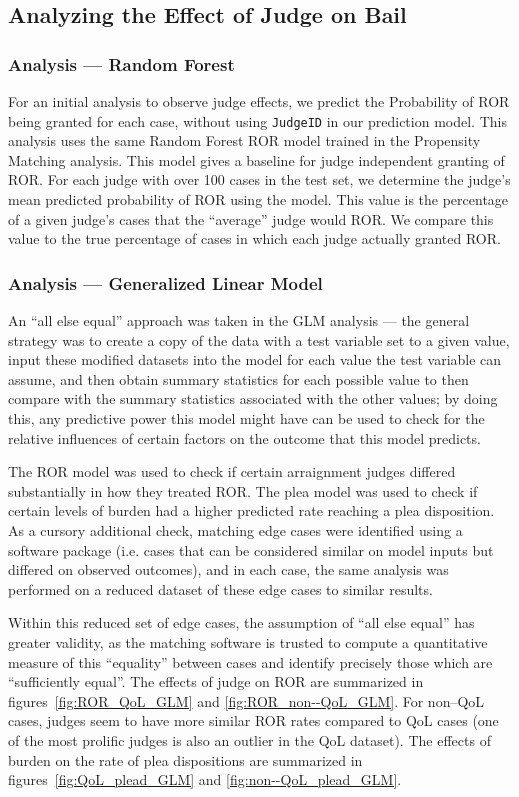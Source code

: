 \subsection{Analyzing the Effect of Judge on Bail}
\subsubsection{Analysis --- Random Forest}
For an initial analysis to observe judge effects,
we predict the Probability of ROR being granted for each case,
without using \texttt{JudgeID} in our prediction model.
This analysis uses the same Random Forest ROR model trained in the Propensity Matching analysis.
This model gives a baseline for judge independent granting of ROR.
For each judge with over 100 cases in the test set,
we determine the judge's mean predicted probability of ROR using the model.
This value is the percentage of a given judge's cases that the ``average'' judge would ROR.
We compare this value to the true percentage of cases in which each judge actually granted ROR.

\subsubsection{Analysis --- Generalized Linear Model}
An ``all else equal'' approach was taken in the GLM analysis
--- the general strategy was to create a copy of the data with a test variable set to a given value,
input these modified datasets into the model for each value the test variable can assume,
and then obtain summary statistics for each possible value
to then compare with the summary statistics associated with the other values;
by doing this,
any predictive power this model might have can be used
to check for the relative influences of certain factors on the outcome that this model predicts.

The ROR model was used to check if certain arraignment judges differed substantially in how they treated ROR.
The plea model was used to check if certain levels of burden had a higher predicted rate reaching a plea disposition.
As a cursory additional check,
matching edge cases were identified using a software package
(i.e. cases that can be considered similar on model inputs but differed on observed outcomes),
and in each case,
the same analysis was performed on a reduced dataset of these edge cases to similar results.

Within this reduced set of edge cases,
the assumption of ``all else equal'' has greater validity,
as the matching software is trusted to compute a quantitative measure of this
``equality'' between cases and identify precisely those which are ``sufficiently equal''.
The effects of judge on ROR are summarized in
figures~\ref{fig:ROR_QoL_GLM} and
        \ref{fig:ROR_non--QoL_GLM}.
For non--QoL cases,
judges seem to have more similar ROR rates compared to QoL cases
(one of the most prolific judges is also an outlier in the QoL dataset).
The effects of burden on the rate of plea dispositions are summarized in
figures~\ref{fig:QoL_plead_GLM} and
        \ref{fig:non--QoL_plead_GLM}.

